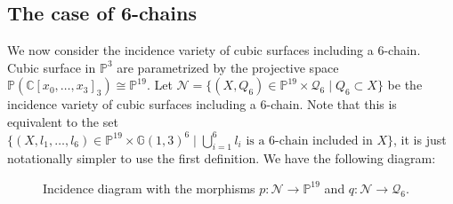 

\subsection{The case of 6-chains}
We now consider the incidence variety of cubic surfaces including a 6-chain. Cubic surface in $\mathbb{P}^3$ are parametrized by the projective space $\mathbb{P}(\mathbb{C}[x_0,\dots, x_3]_3) \cong \mathbb{P}^{19}$. Let $ \mathcal{N} = \{(X, Q_6) \in \mathbb{P}^{19} \times \mathcal{Q}_6 \mid Q_6 \subset X\}$ be the incidence variety of cubic surfaces including a 6-chain. Note that this is equivalent to the set $\{(X, l_1, \dots, l_6) \in \mathbb{P}^{19} \times \mathbb{G}(1,3)^6 \mid \bigcup_{i=1}^6 l_i \text{ is a 6-chain included in } X\}$, it is just notationally simpler to use the first definition. We have the following diagram:

\begin{figure}[ht]
    \centering
    \caption{Incidence diagram with the morphisms $p:\mathcal{N} \to \mathbb{P}^{19}$ and $q:\mathcal{N}\to\mathcal{Q}_6$.}
    \label{fig:incidence}
\end{figure}

